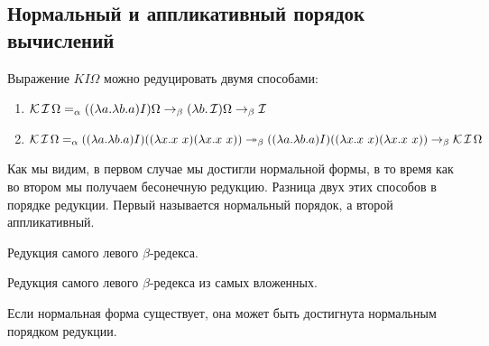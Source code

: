 \subsection{Нормальный и аппликативный порядок вычислений}

\begin{example}
	Выражение $KI\Omega$ можно редуцировать двумя способами:
	\begin{enumerate}
		\item $\operatorname{\mathcal{K}} \operatorname{\mathcal{I}} \Omega =_{\alpha} ((\lambda{}a.\lambda{}b.a) I) \Omega \to_{\beta} (\lambda{}b.\operatorname{\mathcal{I}})\Omega  \to_{\beta} \operatorname{\mathcal{I}}$
		\item  $\comb K \comb I \Omega =_{\alpha} ((\lambda{}a.\lambda{}b.a) I)((\lambda{}x.x \ x) (\lambda{}x.x \ x)) \twoheadrightarrow_{\beta} ((\lambda{}a.\lambda{}b.a) I)((\lambda{}x.x \ x) (\lambda{}x.x \ x)) \to_{\beta} \comb K \comb I \Omega $
	\end{enumerate}
	
\end{example}

Как мы видим, в первом случае мы достигли нормальной формы, в то время как во втором мы получаем бесонечную редукцию. Разница двух этих способов в порядке редукции. Первый называется нормальный порядок, а второй аппликативный. 

\begin{definition}
	Редукция самого левого $\beta$-редекса.
\end{definition}

\begin{definition}
	Редукция самого левого $\beta$-редекса из самых вложенных.
\end{definition}

\begin{statement}
	Если нормальная форма существует, она может быть достигнута нормальным порядком редукции.
\end{statement}